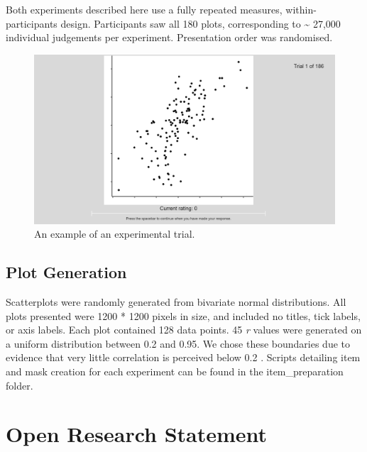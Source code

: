 \documentclass[preprint, 3p,
authoryear]{elsarticle} %
\begin{document}
Both experiments described here use a fully repeated measures,
within-participants design. Participants saw all 180 plots,
corresponding to \textasciitilde{} 27,000 individual judgements per
experiment. Presentation order was randomised.

\begin{figure}

\includegraphics[width=0.5\linewidth]{images/example-trial} \hfill{}

\caption{\label{example-trial}An example of an experimental trial.}\label{fig:example-trial}
\end{figure}

\hypertarget{plot-generation}{%
\subsection{Plot Generation}\label{plot-generation}}

Scatterplots were randomly generated from bivariate normal
distributions. All plots presented were 1200 * 1200 pixels in size, and
included no titles, tick labels, or axis labels. Each plot contained 128
data points. 45 \emph{r} values were generated on a uniform distribution
between 0.2 and 0.95. We chose these boundaries due to evidence that
very little correlation is perceived below 0.2
\citep{bobko_1979, cleveland_1982, strahan_1978}. Scripts detailing item
and mask creation for each experiment can be found in the
item\_preparation folder.

\hypertarget{open-research-statement}{%
\section{Open Research Statement}\label{open-research-statement}}
\end{document}
